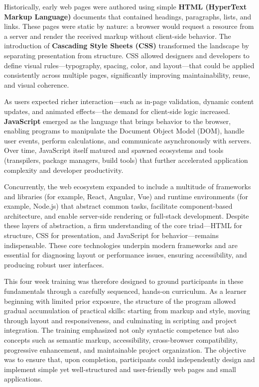 \documentclass[a4paper,12pt,oneside]{report}
\numberwithin{equation}{chapter}
\numberwithin{figure}{chapter}
\numberwithin{table}{chapter}
\begin{document}
Historically, early web pages were authored using simple \textbf{HTML (HyperText Markup Language)} documents that contained headings, paragraphs, lists, and links. These pages were static by nature: a browser would request a resource from a server and render the received markup without client-side behavior. The introduction of \textbf{Cascading Style Sheets (CSS)} transformed the landscape by separating presentation from structure. CSS allowed designers and developers to define visual rules—typography, spacing, color, and layout—that could be applied consistently across multiple pages, significantly improving maintainability, reuse, and visual coherence.

As users expected richer interaction—such as in-page validation, dynamic content updates, and animated effects—the demand for client-side logic increased. \textbf{JavaScript} emerged as the language that brings behavior to the browser, enabling programs to manipulate the Document Object Model (DOM), handle user events, perform calculations, and communicate asynchronously with servers. Over time, JavaScript itself matured and spawned ecosystems and tools (transpilers, package managers, build tools) that further accelerated application complexity and developer productivity.

Concurrently, the web ecosystem expanded to include a multitude of frameworks and libraries (for example, React, Angular, Vue) and runtime environments (for example, Node.js) that abstract common tasks, facilitate component-based architecture, and enable server-side rendering or full-stack development. Despite these layers of abstraction, a firm understanding of the core triad—HTML for structure, CSS for presentation, and JavaScript for behavior—remains indispensable. These core technologies underpin modern frameworks and are essential for diagnosing layout or performance issues, ensuring accessibility, and producing robust user interfaces.

This four week training was therefore designed to ground participants in these fundamentals through a carefully sequenced, hands-on curriculum. As a learner beginning with limited prior exposure, the structure of the program allowed gradual accumulation of practical skills: starting from markup and style, moving through layout and responsiveness, and culminating in scripting and project integration. The training emphasized not only syntactic competence but also concepts such as semantic markup, accessibility, cross-browser compatibility, progressive enhancement, and maintainable project organization. The objective was to ensure that, upon completion, participants could independently design and implement simple yet well-structured and user-friendly web pages and small applications.
\end{document}
